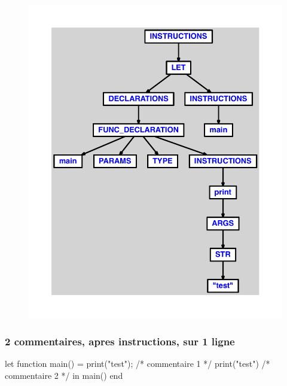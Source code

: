 \documentclass{article}
\begin{document}
\begin{figure}[H]\centering\includegraphics[max width=\textwidth]{ast/ast_155.pdf}\end{figure}\subsubsection{2 commentaires, apres instructions, sur 1 ligne}
\begin{verbatimtab}
let
	function main() =
		print("test");
		/* commentaire 1 */
		print("test")
		/* commentaire 2 */
in main() end
\end{verbatimtab}
\end{document}
